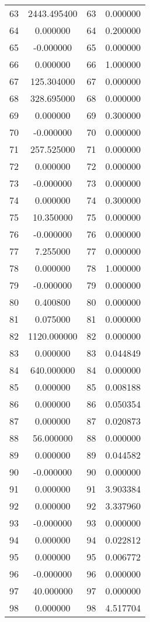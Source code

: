 \documentclass[12pt]{article}
\begin{document}
\begin{longtable}{@{}cccc@{}}
63 & 2443.495400 & 63 & 0.000000 \\
64 & 0.000000 & 64 & 0.200000 \\
65 & -0.000000 & 65 & 0.000000 \\
66 & 0.000000 & 66 & 1.000000 \\
67 & 125.304000 & 67 & 0.000000 \\
68 & 328.695000 & 68 & 0.000000 \\
69 & 0.000000 & 69 & 0.300000 \\
70 & -0.000000 & 70 & 0.000000 \\
71 & 257.525000 & 71 & 0.000000 \\
72 & 0.000000 & 72 & 0.000000 \\
73 & -0.000000 & 73 & 0.000000 \\
74 & 0.000000 & 74 & 0.300000 \\
75 & 10.350000 & 75 & 0.000000 \\
76 & -0.000000 & 76 & 0.000000 \\
77 & 7.255000 & 77 & 0.000000 \\
78 & 0.000000 & 78 & 1.000000 \\
79 & -0.000000 & 79 & 0.000000 \\
80 & 0.400800 & 80 & 0.000000 \\
81 & 0.075000 & 81 & 0.000000 \\
82 & 1120.000000 & 82 & 0.000000 \\
83 & 0.000000 & 83 & 0.044849 \\
84 & 640.000000 & 84 & 0.000000 \\
85 & 0.000000 & 85 & 0.008188 \\
86 & 0.000000 & 86 & 0.050354 \\
87 & 0.000000 & 87 & 0.020873 \\
88 & 56.000000 & 88 & 0.000000 \\
89 & 0.000000 & 89 & 0.044582 \\
90 & -0.000000 & 90 & 0.000000 \\
91 & 0.000000 & 91 & 3.903384 \\
92 & 0.000000 & 92 & 3.337960 \\
93 & -0.000000 & 93 & 0.000000 \\
94 & 0.000000 & 94 & 0.022812 \\
95 & 0.000000 & 95 & 0.006772 \\
96 & -0.000000 & 96 & 0.000000 \\
97 & 40.000000 & 97 & 0.000000 \\
98 & 0.000000 & 98 & 4.517704 \\

\end{longtable}
\end{document}
